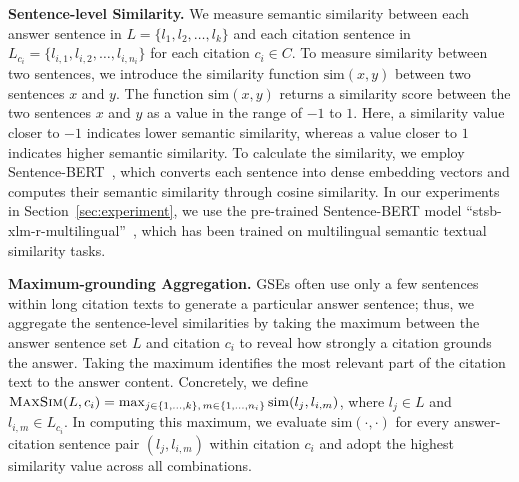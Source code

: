 \textbf{Sentence-level Similarity.}
We measure semantic similarity between each answer sentence in $L = \{l_1, l_2, \ldots, l_k\}$ and each citation sentence in $L_{c_i} = \{l_{i,1}, l_{i,2}, \ldots, l_{i,n_i}\}$ for each citation $c_i \in C$.
To measure similarity between two sentences, we introduce the similarity function $\mathrm{sim}(x, y)$ between two sentences $x$ and $y$.
The function $\mathrm{sim}(x, y)$ returns a similarity score between the two sentences $x$ and $y$ as a value in the range of $-1$ to $1$.
Here, a similarity value closer to $-1$ indicates lower semantic similarity, whereas a value closer to $1$ indicates higher semantic similarity.
To calculate the similarity, we employ Sentence-BERT~\cite{reimers2019sbert}, which converts each sentence into dense embedding vectors and computes their semantic similarity through cosine similarity.
In our experiments in Section~\ref{sec:experiment}, we use the pre-trained Sentence-BERT model ``stsb-xlm-r-multilingual''~\cite{reimers2019sbert}, which has been trained on multilingual semantic textual similarity tasks.

\textbf{Maximum-grounding Aggregation.}
GSEs often use only a few sentences within long citation texts to generate a particular answer sentence; thus, we aggregate the sentence-level similarities by taking the maximum between the answer sentence set $L$ and citation $c_i$ to reveal how strongly a citation grounds the answer.
Taking the maximum identifies the most relevant part of the citation text to the answer content.
Concretely, we define $\textsc{MaxSim}(L, c_i) = \max_{j \in \{1,\ldots,k\},\, m \in \{1,\ldots,n_i\}} \mathrm{sim}(l_j, l_{i,m})$, where $l_j \in L$ and $l_{i,m} \in L_{c_i}$.
In computing this maximum, we evaluate $\mathrm{sim}(\cdot, \cdot)$ for every answer-citation sentence pair $(l_j, l_{i,m})$ within citation $c_i$ and adopt the highest similarity value across all combinations.

